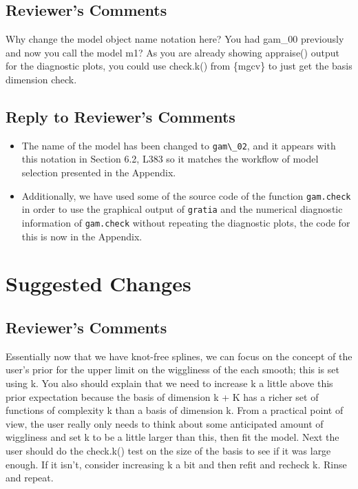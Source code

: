 \documentclass[
]{article}
\newcommand{\passthrough}[1]{#1}
\providecommand{\tightlist}{%
  \setlength{\itemsep}{0pt}\setlength{\parskip}{0pt}}
\begin{document}
\hypertarget{reviewers-comments-11}{%
\subsection{Reviewer's Comments}\label{reviewers-comments-11}}

Why change the model object name notation here? You had gam\_00 previously and now you call the model m1? As you are already showing appraise() output for the diagnostic plots, you could use check.k() from \{mgcv\} to just get the basis dimension check.

\hypertarget{section-12}{%
\subsection{\texorpdfstring{\textcolor{reviewersblue} {Reply to Reviewer's Comments}}{}}\label{section-12}}

\begin{itemize}
\tightlist
\item
  The name of the model has been changed to \passthrough{\lstinline!gam\_02!}, and it appears with this notation in Section 6.2, L383 so it matches the workflow of model selection presented in the Appendix.
\item
  Additionally, we have used some of the source code of the function \passthrough{\lstinline!gam.check!} in order to use the graphical output of \passthrough{\lstinline!gratia!} and the numerical diagnostic information of \passthrough{\lstinline!gam.check!} without repeating the diagnostic plots, the code for this is now in the Appendix.
\end{itemize}

\hypertarget{suggested-changes}{%
\section{Suggested Changes}\label{suggested-changes}}

\hypertarget{reviewers-comments-12}{%
\subsection{Reviewer's Comments}\label{reviewers-comments-12}}

Essentially now that we have knot-free splines, we can focus on the concept of the user's prior for the upper limit on the wiggliness of the each smooth; this is set using k. You also should explain that we need to increase k a little above this prior expectation because the basis of dimension k + K has a richer set of functions of complexity k than a basis of dimension k. From a practical point of view, the user really only needs to think about some anticipated amount of wiggliness and set k to be a little larger than this, then fit the model.
Next the user should do the check.k() test on the size of the basis to see if it was large enough. If it isn't, consider increasing k a bit and then refit and recheck k. Rinse and repeat.
\end{document}
